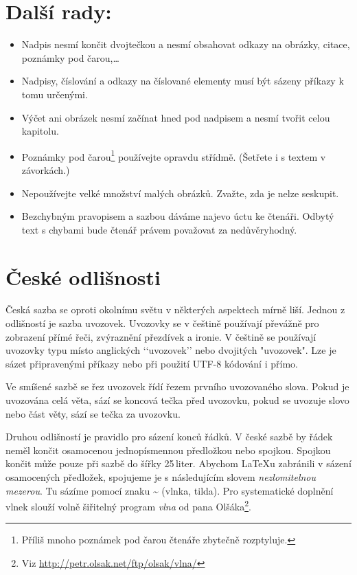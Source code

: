 \documentclass[twocolumn,a4paper]{article}
\begin{document}
\section{Další rady:}
\label{3}

\begin{itemize}
\item Nadpis nesmí končit dvojtečkou a nesmí obsahovat odkazy na obrázky, citace, poznámky pod čarou,\dots

\item Nadpisy, číslování a odkazy na číslované elementy musí být sázeny příkazy k tomu určenými.

\item Výčet ani obrázek nesmí začínat hned pod nadpisem a nesmí tvořit celou kapitolu.

\item Poznámky pod čarou\footnote{Příliš mnoho poznámek pod čarou čtenáře zbytečně rozptyluje.} používejte opravdu střídmě. (Šetřete i s textem v závorkách.)

\item Nepoužívejte velké množství malých obrázků. Zvažte, zda je nelze seskupit.

\item Bezchybným pravopisem a sazbou dáváme najevo úctu ke čtenáři. Odbytý text s chybami bude čtenář právem považovat za nedůvěryhodný.
\end{itemize}

\section{České odlišnosti}

Česká sazba se oproti okolnímu světu v některých aspektech mírně liší. Jednou z odlišností je sazba uvozovek. Uvozovky se v češtině používají převážně pro zobrazení přímé řeči, zvýraznění přezdívek a ironie. V češtině se používají uvozovky typu  místo anglických ‘‘uvozovek’’ nebo dvojitých "uvozovek". Lze je sázet připravenými příkazy nebo při použití UTF-8 kódování i přímo.

Ve smíšené sazbě se řez uvozovek řídí řezem prvního uvozovaného slova. Pokud je uvozována celá věta, sází se koncová tečka před uvozovku, pokud se uvozuje slovo nebo část věty, sází se tečka za uvozovku.

Druhou odlišností je pravidlo pro sázení konců řádků. V české sazbě by řádek neměl končit osamocenou jednopísmennou předložkou nebo spojkou. Spojkou  končit může pouze při sazbě do šířky 25\,liter. Abychom {\LaTeX}u zabránili v sázení osamocených předložek, spojujeme je s následujícím slovem \emph{nezlomitelnou mezerou}. Tu sázíme pomocí znaku \~{} (vlnka, tilda). Pro systematické doplnění vlnek slouží volně šiřitelný program \emph{vlna} od pana Olšáka\footnote{Viz \url{http://petr.olsak.net/ftp/olsak/vlna/}}.
\end{document}
